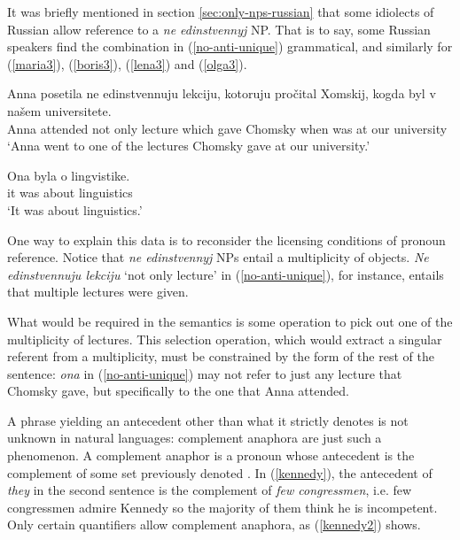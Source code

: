 It was briefly mentioned in section \ref{sec:only-nps-russian} that some idiolects of Russian allow reference to a \textit{ne edinstvennyj} NP. That is to say, some Russian speakers find the combination in (\ref{no-anti-unique}) grammatical, and similarly for (\ref{maria3}), (\ref{boris3}), (\ref{lena3}) and (\ref{olga3}).

\begin{exe}
	\ex \label{no-anti-unique} \begin{xlist}
		\ex \gll Anna posetila ne edinstvennuju lekciju, kotoruju pro\v{c}ital Xomskij, kogda byl v na\v{s}em universitete.\\
		Anna attended not only lecture which gave Chomsky when was at our university\\
		\glt `Anna went to one of the lectures Chomsky gave at our university.'
		
		\ex \gll Ona byla o lingvistike.\\
		it was about linguistics\\
		\glt `It was about linguistics.'
	\end{xlist}
\end{exe}

One way to explain this data is to reconsider the licensing conditions of pronoun reference. Notice that \textit{ne edinstvennyj} NPs entail a multiplicity of objects. \textit{Ne edinstvennuju lekciju} `not only lecture' in (\ref{no-anti-unique}), for instance, entails that multiple lectures were given.

What would be required in the semantics is some operation to pick out one of the multiplicity of lectures. This selection operation, which would extract a singular referent from a multiplicity, must be constrained by the form of the rest of the sentence: \textit{ona} in (\ref{no-anti-unique}) may not refer to just any lecture that Chomsky gave, but specifically to the one that Anna attended.

A phrase yielding an antecedent other than what it strictly denotes is not unknown in natural languages: complement anaphora are just such a phenomenon. A complement anaphor is a pronoun whose antecedent is the complement of some set previously denoted \citep{nouwen03, schwarz09}. In (\ref{kennedy}), the antecedent of \textit{they} in the second sentence is the complement of \textit{few congressmen}, i.e. few congressmen admire Kennedy so the majority of them think he is incompetent. Only certain quantifiers allow complement anaphora, as (\ref{kennedy2}) shows.

